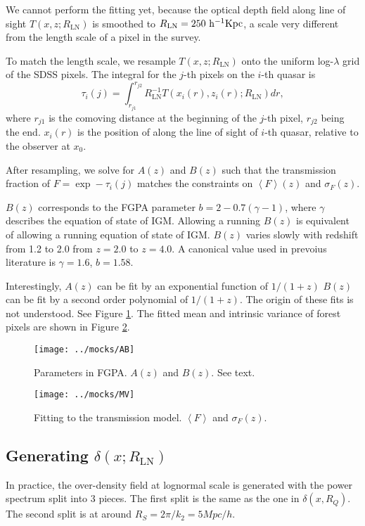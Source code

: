 \documentclass{paper}
\begin{document}
    We cannot perform the fitting yet, because the 
    optical depth field along line of sight $T(x, z; R_\mathrm{LN})$ 
    is smoothed to $R_\mathrm{LN} = 250 \,\kpch$, a scale
    very different from the length scale of a pixel in the survey.

    To match the length scale, we resample $T(x, z; R_\mathrm{LN})$ 
    onto the uniform log-$\lambda$ grid of the SDSS pixels. 
    The integral for the $j$-th pixels on the $i$-th
    quasar is
    \[
        \tau_i(j) = \int_{r_{j1}}^{r_{j2}} 
        R_\mathrm{LN}^{-1} T(x_i(r), z_i(r); R_\mathrm{LN}) d r, 
    \]
    where $r_{j1}$ is the comoving distance at the beginning of 
    the $j$-th pixel, $r_{j2}$ being the end.
    $x_i(r)$ is the position of along the line of sight of
    $i$-th quasar, relative to the observer at $x_0$. 

    After resampling, we solve for $A(z)$ and $B(z)$ such
    that the transmission fraction 
    of $F = \exp -\tau_i(j)$  matches the constraints on
    $\left<F\right>(z)$ and $\sigma_F(z)$. 

    $B(z)$ corresponds to the FGPA parameter 
    $b = 2-0.7(\gamma-1)$, where $\gamma$ describes the equation of 
    state of IGM.  Allowing a running $B(z)$ 
    is equivalent of allowing a running equation of state of IGM.
    $B(z)$ varies slowly with redshift from 1.2 to 2.0 from
    $z=2.0$ to $z=4.0$. A canonical value used in prevoius
    literature is $\gamma = 1.6$, $b=1.58$.

    Interestingly, $A(z)$ can be fit by an exponential function of $1/(1+z)$
    $B(z)$ can be fit by a second order polynomial of
    $1/(1+z)$. The origin of these fits is not understood.
    See Figure \ref{fig:FGPA-AB}. The fitted mean
    and intrinsic variance of forest pixels are shown in
    Figure \ref{fig:FGPA-MV}.

    \begin{figure}
      \texttt{[image: ../mocks/AB]}
      \caption{Parameters in FGPA. $A(z)$ and $B(z)$. See text.}
      \label{fig:FGPA-AB}
    \end{figure}

    \begin{figure}
      \texttt{[image: ../mocks/MV]}
      \caption{Fitting to the transmission model. $\left<F\right>$ and
$\sigma_F(z)$.}
      \label{fig:FGPA-MV}
    \end{figure}

\subsection{Generating $\delta(x; R_\mathrm{LN})$}
    In practice, the over-density field at lognormal scale is
    generated with the power spectrum split into 3 pieces.
    The first split is the same as the one in $\delta(x, R_Q)$. 
    The second split is at around $R_S = 2\pi / k_2 = 5
    \unit{Mpc/h}$.
\end{document}
